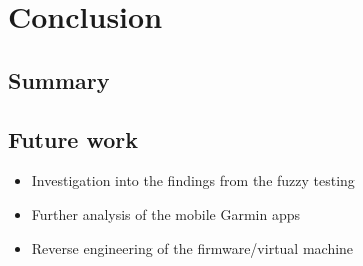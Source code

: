 \chapter{Conclusion}
\section{Summary}
\section{Future work}


\begin{itemize}
    \item Investigation into the findings from the fuzzy testing
    \item Further analysis of the mobile Garmin apps
    \item Reverse engineering of the firmware/virtual machine
\end{itemize}